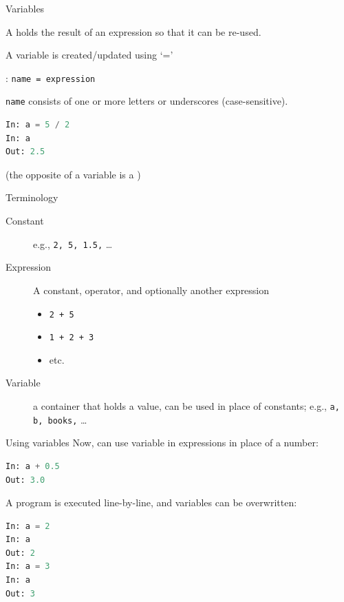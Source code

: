 \documentclass[aspectratio=169,usenames,dvipsnames]{beamer}
\begin{document}
\begin{frame}[fragile]{Variables}
    \begin{definition}
        A  holds the result of an expression
        so that it can be re-used.
    \end{definition}

A variable is created/updated using `='

\pause
\begin{definition}
: \lstinline{name = expression}

\lstinline{name} consists of one or more letters or underscores (case-sensitive).
\end{definition}

\begin{lstlisting}[language=python]
In: a = 5 / 2
In: a
Out: 2.5
\end{lstlisting}

(the opposite of a variable is a )
\end{frame}

\begin{frame}{Terminology}
    \begin{description}
        \item[Constant]
            e.g., \lstinline{2, 5, 1.5,} \dots
        \item[Expression]
            A constant, operator, and optionally another expression
            \begin{itemize}
                \item \lstinline{2 + 5}
                \item \lstinline{1 + 2 + 3}
                \item etc.
            \end{itemize}
        \item[Variable] a container that holds a value,
            can be used in place of constants;
            e.g., \lstinline{a, b, books,} \dots
    \end{description}
\end{frame}

\begin{frame}[fragile]{Using variables}
Now, can use variable in expressions in place of a number:

\begin{lstlisting}[language=python]
In: a + 0.5
Out: 3.0
\end{lstlisting}

\pause
A program is executed line-by-line, and variables can be overwritten:
\begin{lstlisting}[language=python]
In: a = 2
In: a
Out: 2
In: a = 3
In: a
Out: 3
\end{lstlisting}
\end{frame}
\end{document}
